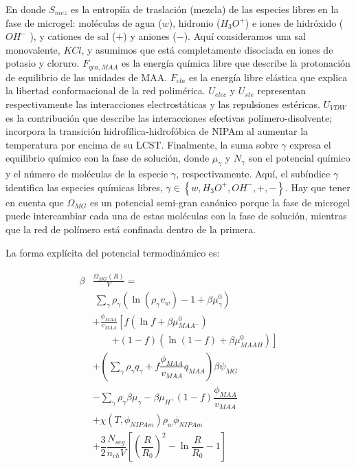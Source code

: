 \noindent En donde $S_{mez}$ es la entropí\'ia de traslaci\'on (mezcla) de las especies libres en la fase de microgel: mol\'eculas de agua ($w$), hidronio ($H_3O^+$) e iones de hidr\'oxido ($OH^-$ ), y cationes de sal ($+$) y aniones ($-$).
Aqu\'i consideramos una sal monovalente, $KCl$, y asumimos que est\'a completamente disociada en iones de potasio y cloruro.
$F_{qca,MAA}$ es la energ\'ia química libre que describe la protonaci\'on de equilibrio de las unidades de MAA.
$F_{ela}$ es la energ\'ia libre el\'astica que explica la libertad conformacional de la red polim\'erica.
$U_{elec}$ y $U_{ste}$ representan respectivamente las interacciones electrost\'aticas y las repulsiones est\'ericas.
$U_{VDW}$ es la contribuci\'on que describe las interacciones efectivas pol\'imero-disolvente; incorpora la transici\'on hidrofílica-hidrof\'obica de NIPAm al aumentar la temperatura por encima de su LCST.
Finalmente, la suma sobre  $\gamma$ expresa el equilibrio qu\'imico con la fase de soluci\'on, donde $\mu_\gamma$ y $N_\gamma$ son el potencial qu\'imico y el n\'umero de mol\'eculas de la especie $\gamma$, respectivamente.
Aqu\'i, el subíndice $\gamma$ identifica  las especies qu\'imicas libres, $\gamma \in \left\{ w, H_3O^+, OH^-, +,- \right\}$.
Hay que tener en cuenta que $\Omega_{MG}$ es un potencial semi-gran can\'onico porque la fase de microgel puede intercambiar cada una de estas mol\'eculas con la fase de soluci\'on, mientras que la red de pol\'imero está confinada dentro de la primera.

La forma expl\'icita del potencial termodin\'amico es:




%
\begin{align}
\begin{aligned}
\beta&\frac{\Omega_{MG}(R)}{V}=\\& ~ \sum_{\gamma} \rho_\gamma\left(\ln\left(\rho_\gamma v_w\right) -1 + \beta\mu^0_\gamma\right) \\
& + \frac{\phi_{MAA}}{v_{MAA}} \left[f(\ln f+ \beta\mu^0_{MAA^-})\right.\\
&\qquad\left.+(1-f)(\ln (1-f)+\beta\mu^0_{MAAH})\right] \\
%
& +  \left(\sum_{\gamma } {\rho_\gamma q_\gamma + f\dfrac{\phi_{MAA}}{v_{MAA}}q_{MAA}}\right)\beta\psi_{MG}\\
%
& -\sum_{\gamma }{\rho_\gamma\beta\mu_\gamma}
 -\beta\mu_{H^+}(1-f)\dfrac{\phi_{MAA}}{v_{MAA}}\\
%
& + \chi (T, \phi_{NIPAm})\rho_w \phi_{NIPAm} \\
%
& + \dfrac{3}{2}\dfrac{N_{seg}}{n_{ch} V}\left[\left(\dfrac{R}{R_0}\right)^2 - \ln\dfrac{R}{R_0} -1\right]
%
\end{aligned}
\label{eq:free-energy}
\end{align}

